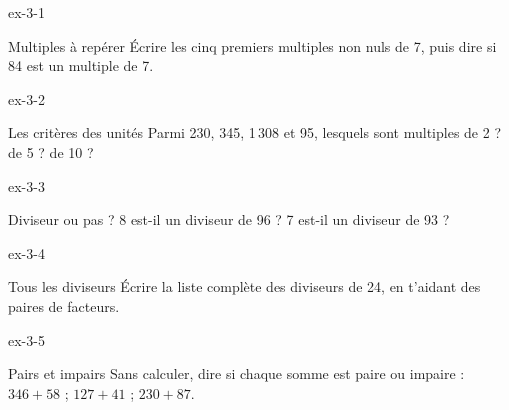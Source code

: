 \clearpage{}
\begin{blocLivre}{ex-3-1}\begin{exercice}[1]{Multiples à repérer}
Écrire les cinq premiers multiples non nuls de 7, puis dire si 84 est un multiple de 7.
\end{exercice}\end{blocLivre}
\begin{blocLivre}{ex-3-2}\begin{exercice}[1]{Les critères des unités}
Parmi 230, 345, 1\,308 et 95, lesquels sont multiples de 2 ? de 5 ? de 10 ?
\end{exercice}\end{blocLivre}
\begin{blocLivre}{ex-3-3}\begin{exercice}[1]{Diviseur ou pas ?}
8 est-il un diviseur de 96 ? 7 est-il un diviseur de 93 ?
\end{exercice}\end{blocLivre}
\begin{blocLivre}{ex-3-4}\begin{exercice}[1]{Tous les diviseurs}
Écrire la liste complète des diviseurs de 24, en t’aidant des paires de facteurs.
\end{exercice}\end{blocLivre}
\begin{blocLivre}{ex-3-5}\begin{exercice}[1]{Pairs et impairs}
Sans calculer, dire si chaque somme est paire ou impaire : $346+58$ ; $127+41$ ; $230+87$.
\end{exercice}\end{blocLivre}

